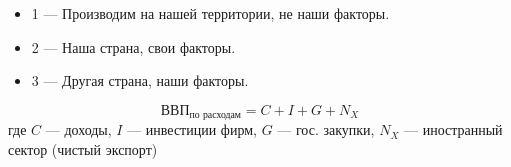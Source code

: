\documentclass{article}
\begin{document}
\begin{center}
\end{center}

\begin{itemize}
    \item 1 --- Производим на нашей территории, не наши факторы.
    \item 2 --- Наша страна, свои факторы.
    \item 3 --- Другая страна, наши факторы.
\end{itemize}


\begin{equation}
    \text{ВВП}_{\text{по расходам}} = C + I + G + N_{X}
\end{equation}
где $C$ --- доходы, $I$ --- инвестиции фирм, $G$ --- гос. закупки, $N_{X}$ --- иностранный сектор (чистый экспорт)
\end{document}
